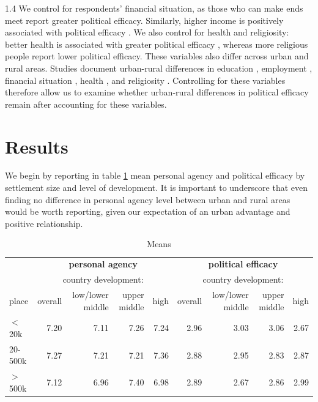 \documentclass[10pt, letterpaper]{article}
\begin{document}
\begin{spacing}{1.4}
We control for respondents' financial situation, as those who can make ends meet report greater political efficacy\citep{luukkonen2022urbanisation,marx2016unemployed}. Similarly, higher income is positively associated with political efficacy \citep{emmenegger2015labour,rowland2024political}. We also control for health and religiosity: better health is associated with greater political efficacy \citep{garcia2024they,gidengil2024healthy,shore2019health}, whereas more religious people report lower political efficacy\citep{marx2016unemployed,rowland2024political}.
These variables also differ across urban and rural areas. Studies document urban-rural differences in education \citep{van2021urban,zahl2024spatial}, employment  \citep{e26,ananian2024employment}, financial situation
 \citep{kpatcha2026unlocking,meloni2024rural,finnemann2024urban},
 health \citep{mackinnon2023mapping,menashe2022shifting},
 and religiosity \citep{balazka2020mapping,meulemann2020secularization}. Controlling for these variables therefore allow us to examine whether urban-rural differences in political efficacy remain after accounting for these variables. 

\section{Results}
We begin by reporting in table \ref{m0} mean personal agency and political
efficacy by settlement size and level of development. It is important to
underscore that even finding no difference in personal agency level between
urban and rural areas would be worth reporting, given our expectation of an
urban advantage and positive relationship.

\begin{table}[H]\centering\footnotesize
\caption{\label{m0} Means}
\begin{tabular} {lrrrr|rrrr}   \hline 
       & \multicolumn{4}{c|}{\bf personal agency}          &\multicolumn{4}{c}{\bf political efficacy}\\
       & \multicolumn{4}{c}{country development:}          &\multicolumn{4}{c}{country development:}\\ 
place  &overall&low/lower middle&upper middle&high&overall&low/lower middle&upper middle&high\\ \hline
$<$20k &7.20   &7.11            &7.26        &7.24&2.96   &3.03            &3.06        &2.67\\
20-500k&7.27   &7.21            &7.21        &7.36&2.88   &2.95            &2.83        &2.87\\
$>$500k&7.12   &6.96            &7.40        &6.98&2.89   &2.67            &2.86        &2.99\\ \hline
\end{tabular}\end{table}


\end{spacing}
\end{document}
